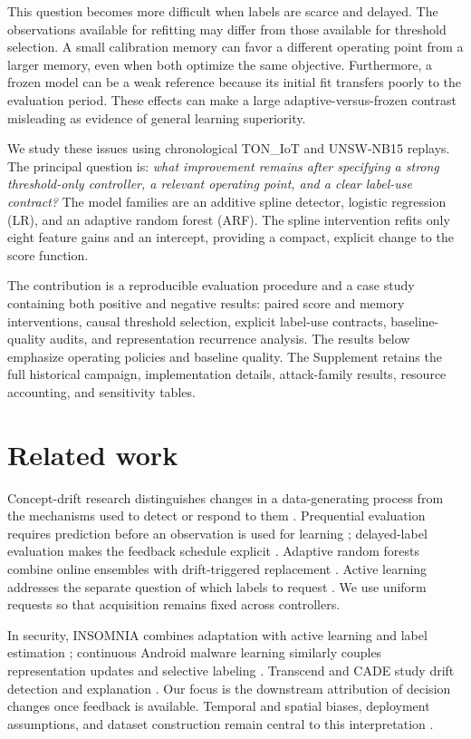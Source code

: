 This question becomes more difficult when labels are scarce and delayed. The observations available for refitting may differ from those available for threshold selection. A small calibration memory can favor a different operating point from a larger memory, even when both optimize the same objective. Furthermore, a frozen model can be a weak reference because its initial fit transfers poorly to the evaluation period. These effects can make a large adaptive-versus-frozen contrast misleading as evidence of general learning superiority.

We study these issues using chronological TON\_IoT and UNSW-NB15 replays. The principal question is: \emph{what improvement remains after specifying a strong threshold-only controller, a relevant operating point, and a clear label-use contract?} The model families are an additive spline detector, logistic regression (LR), and an adaptive random forest (ARF). The spline intervention refits only eight feature gains and an intercept, providing a compact, explicit change to the score function.

The contribution is a reproducible evaluation procedure and a case study containing both positive and negative results: paired score and memory interventions, causal threshold selection, explicit label-use contracts, baseline-quality audits, and representation recurrence analysis. The results below emphasize operating policies and baseline quality. The Supplement retains the full historical campaign, implementation details, attack-family results, resource accounting, and sensitivity tables.

\section{Related work}
Concept-drift research distinguishes changes in a data-generating process from the mechanisms used to detect or respond to them \citep{gama2014}. Prequential evaluation requires prediction before an observation is used for learning \citep{gama2013}; delayed-label evaluation makes the feedback schedule explicit \citep{grzenda2020}. Adaptive random forests combine online ensembles with drift-triggered replacement \citep{gomes2017}. Active learning addresses the separate question of which labels to request \citep{zliobaite2014}. We use uniform requests so that acquisition remains fixed across controllers.

In security, INSOMNIA combines adaptation with active learning and label estimation \citep{andresini2021}; continuous Android malware learning similarly couples representation updates and selective labeling \citep{chen2023}. Transcend and CADE study drift detection and explanation \citep{jordaney2017,yang2021}. Our focus is the downstream attribution of decision changes once feedback is available. Temporal and spatial biases, deployment assumptions, and dataset construction remain central to this interpretation \citep{pendlebury2019,arp2022,sommer2010,engelen2021}.

